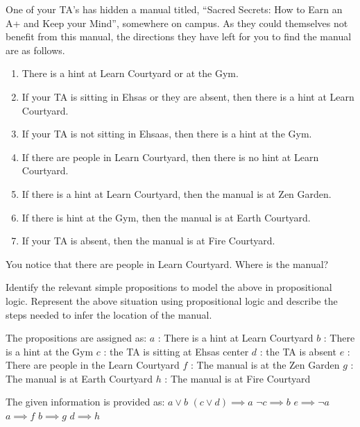 \documentclass[addpoints]{exam}
\begin{document}
\begin{questions}
\question[5] One of your TA's has hidden a manual titled, ``Sacred Secrets: How to Earn an A+ and Keep your Mind'', somewhere on campus. As they could themselves not benefit from this manual, the directions they have left for you to find the manual are as follows.
  \begin{enumerate}
  \item There is a hint at Learn Courtyard or at the Gym.
  \item If your TA is sitting in Ehsas or they are absent, then there is a hint at Learn Courtyard.
  \item If your TA is not sitting in Ehsaas, then there is a hint at the Gym.
  \item If there are people in Learn Courtyard, then there is no hint at Learn Courtyard.
  \item If there is a hint at Learn Courtyard, then the manual is at Zen Garden.
  \item If there is hint at the Gym, then the manual is at Earth Courtyard.
  \item If your TA is absent, then the manual is at Fire Courtyard.
  \end{enumerate}
  You notice that there are people in Learn Courtyard. Where is the manual?

  Identify the relevant simple propositions to model the above in propositional logic. Represent the above situation using propositional logic and describe the steps needed to infer the location of the manual.
  \begin{solution}
    The propositions are assigned as:
    \newline$a$ : There is a hint at Learn Courtyard
    \newline$b$ : There is a hint at the Gym
    \newline$c$ : the TA is sitting at Ehsas center
    \newline$d$ : the TA is absent
    \newline$e$ : There are people in the Learn Courtyard
    \newline$f$ : The manual is at the Zen Garden
    \newline$g$ : The manual is at Earth Courtyard
    \newline$h$ : The manual is at Fire Courtyard

    The given information is provided as:
    \newline $a \lor b$
    \newline $(c \lor d) \implies a$
    \newline $\neg c \implies b$
    \newline $e \implies \neg a$
    \newline $a \implies f$
    \newline $b \implies g$
    \newline $d \implies h$


\end{solution}
\end{questions}
\end{document}
